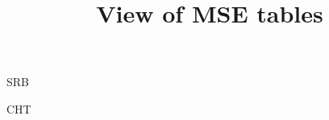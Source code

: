 \documentclass{article}
\title{View of MSE tables}
\begin{document}
\maketitle

SRB



\newpage

CHT


\end{document}
